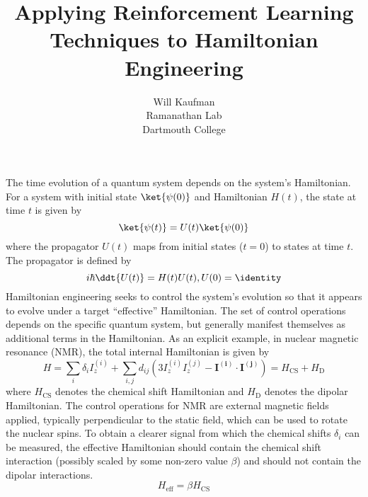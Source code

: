 \documentclass{article}
\title{Applying Reinforcement Learning Techniques to Hamiltonian Engineering}
\author{Will Kaufman \\ Ramanathan Lab \\ Dartmouth College}
\begin{document}
\maketitle


The time evolution of a quantum system depends on the system's Hamiltonian. For a system with initial state $\ket{\psi(0)}$ and Hamiltonian $H(t)$, the state at time $t$ is given by
\[
\ket{\psi(t)} = U(t)\ket{\psi(0)}
\]
where the propagator $U(t)$ maps from initial states ($t=0$) to states at time $t$. The propagator is defined by
\begin{equation}
    i\hbar \ddt{U(t)} = H(t) U(t), U(0) = \identity
\end{equation}
Hamiltonian engineering seeks to control the system's evolution so that it appears to evolve under a target ``effective'' Hamiltonian. The set of control operations depends on the specific quantum system, but generally manifest themselves as additional terms in the Hamiltonian. As an explicit example, in nuclear magnetic resonance (NMR), the total internal Hamiltonian is given by
\begin{equation}
    H = \sum_i \delta_i I_z^{(i)} + \sum_{i,j} d_{ij} \left( 3I_z^{(i)}I_z^{(j)} - \mathbf{I^{(i)}} \cdot \mathbf{I^{(j)}} \right) = H_\text{CS} + H_\text{D}
\end{equation}
where $H_\text{CS}$ denotes the chemical shift Hamiltonian and $H_\text{D}$ denotes the dipolar Hamiltonian.
The control operations for NMR are external magnetic fields applied, typically perpendicular to the static field, which can be used to rotate the nuclear spins.
To obtain a clearer signal from which the chemical shifts $\delta_i$ can be measured, the effective Hamiltonian should contain the chemical shift interaction (possibly scaled by some non-zero value $\beta$) and should not contain the dipolar interactions.
\[
H_\text{eff} = \beta H_\text{CS}
\]
\end{document}
